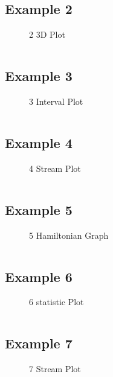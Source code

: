 \subsection{Example 2}
\begin{figure}[!htb]
    \centering
    
    \caption{2 3D Plot}
    \label{fig:2-3d-plot}
\end{figure}
\inputminted{mathematica}{./Example/example_2.wls}
\newpage


\subsection{Example 3}
\begin{figure}[!htb]
    \centering
    
    \caption{3 Interval Plot}
    \label{fig:3-interval-plot}
\end{figure}
\inputminted{mathematica}{./Example/example_3.wls}
\newpage


\subsection{Example 4}
\begin{figure}[!htb]
    \centering
    
    \caption{4 Stream Plot}
    \label{fig:4-stream-plot}
\end{figure}
\inputminted{mathematica}{./Example/example_4.wls}
\newpage

\subsection{Example 5}
\begin{figure}[!htb]
    \centering
    
    \caption{5 Hamiltonian Graph}
    \label{fig:5-hamiltonian-graph}
\end{figure}
\inputminted{mathematica}{./Example/example_5.wls}
\newpage


\subsection{Example 6}
\begin{figure}[!htb]
    \centering
    
    \caption{6 statistic Plot}
    \label{fig:6-statistic-plot}
\end{figure}
\inputminted{mathematica}{./Example/example_6.wls}
\newpage



\subsection{Example 7}
\begin{figure}[!htb]
    \centering
    
    \caption{7 Stream Plot}
    \label{fig:7-stream-plot}
\end{figure}
\inputminted{mathematica}{./Example/example_7.wls}
\newpage

